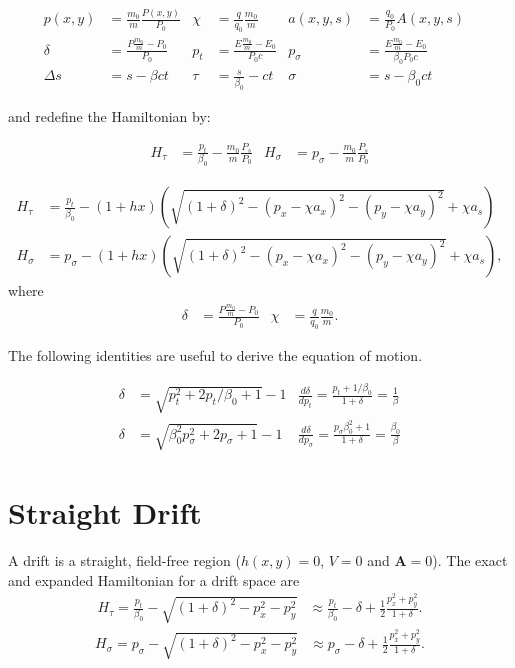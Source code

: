 \documentclass[english]{article}
\begin{document}
\begin{align}
p(x,y) &= \frac{m_0}{m}\frac{P(x,y)}{P_0}   &
\chi &= \frac{q}{q_0}\frac{m_0}{m} &
a(x,y,s) &= \frac{q_0}{P_0}  A(x,y,s) \\
\delta &= \frac{P \frac{m_0}{m} -P_0}{P_0} &
p_t &= \frac{E \frac{m_0}{m} -E_0}{P_0c} &
p_\sigma &= \frac{E \frac{m_0}{m} -E_0}{\beta_0 P_0c}
\\
\Delta s &= s - \beta c t &
\tau &= \frac{s}{\beta_0} - ct &
\sigma &= s - \beta_0 ct &
\end{align}

and redefine the Hamiltonian by:

\begin{align}
 H_\tau   &= \frac{p_t}{\beta_0} - \frac{m_0}{m}\frac{P_s}{P_0} &
 H_\sigma &= p_\sigma - \frac{m_0}{m}\frac{P_s}{P_0}
\end{align}

\begin{align} 
 H_\tau   &= \frac{p_t}{\beta_0} - (1+h x) \left(
      \sqrt{ (1+\delta)^2
           - (p_x - \chi a_x)^2
           - (p_y - \chi a_y)^2}
       + \chi a_s
    \right) \\
  H_\sigma &= p_\sigma - (1+h x) \left(
      \sqrt{ (1+\delta)^2
           - (p_x - \chi a_x)^2
           - (p_y - \chi a_y)^2}
       + \chi a_s
    \right),
\end{align}
where 
\begin{align}
\delta &= \frac{P \frac{m_0}{m} -P_0}{P_0} &
\chi &= \frac{q}{q_0}\frac{m_0}{m}.
\end{align}

The following identities are useful to derive the equation of motion.

\begin{align}
\delta&=\sqrt{p_t^2 + 2 p_t/\beta_0 +1} -1 &
\frac{d \delta}{d p_t}= \frac{p_t+1/\beta_0}{1+\delta} = \frac{1}{\beta} \\
\delta&=\sqrt{\beta_0^2 p_\sigma^2 + 2 p_\sigma +1} -1 &
\frac{d \delta}{d p_\sigma}= \frac{p_\sigma\beta_0^2+1}{1+\delta} = \frac{\beta_0}{\beta}
\end{align}


\section{Straight Drift}
A drift is a straight, field-free region ($h(x,y)=0$, $V=0$ and
$\mathbf{A}=0$).  The exact and expanded Hamiltonian for a drift space are
\begin{align}
  H_\tau = \frac{p_t}{\beta_0} - \sqrt{(1+\delta)^2 - p_x^2 - p_y^2} &\approx
  \frac{p_t}{\beta_0} - \delta + \frac{1}{2}\frac{p_x^2+p_y^2}{1+\delta}.
\end{align}
\begin{align}
  H_\sigma = p_\sigma - \sqrt{(1+\delta)^2 - p_x^2 - p_y^2} &\approx
  p_\sigma - \delta + \frac{1}{2}\frac{p_x^2+p_y^2}{1+\delta}.
\end{align}
\end{document}
